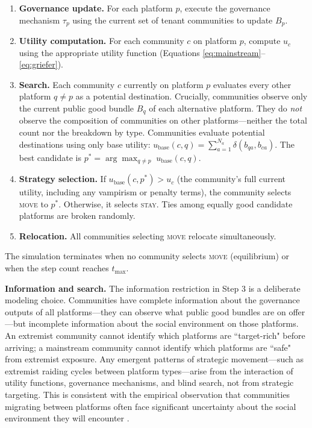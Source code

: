 \documentclass[12pt]{article}
\begin{document}
\begin{enumerate}
    \item \textbf{Governance update.} For each platform $p$, execute the governance mechanism $\tau_p$ using the current set of tenant communities to update $B_p$.
    
    \item \textbf{Utility computation.} For each community $c$ on platform $p$, compute $u_c$ using the appropriate utility function (Equations \ref{eq:mainstream}--\ref{eq:griefer}).
    
    \item \textbf{Search.} Each community $c$ currently on platform $p$ evaluates every other platform $q \neq p$ as a potential destination. Crucially, communities observe only the current public good bundle $B_q$ of each alternative platform. They do \textit{not} observe the composition of communities on other platforms---neither the total count nor the breakdown by type. Communities evaluate potential destinations using only base utility: $u_{\text{base}}(c, q) = \sum_{a=1}^{N_a} \delta(b_{qa}, b_{ca})$. The best candidate is $p^* = \arg\max_{q \neq p} \; u_{\text{base}}(c, q)$.
    
    \item \textbf{Strategy selection.} If $u_{\text{base}}(c, p^*) > u_c$ (the community's full current utility, including any vampirism or penalty terms), the community selects \textsc{move} to $p^*$. Otherwise, it selects \textsc{stay}. Ties among equally good candidate platforms are broken randomly.
    
    \item \textbf{Relocation.} All communities selecting \textsc{move} relocate simultaneously.
\end{enumerate}

\noindent The simulation terminates when no community selects \textsc{move} (equilibrium) or when the step count reaches $t_{\max}$.

\textbf{Information and search.} The information restriction in Step 3 is a deliberate modeling choice. Communities have complete information about the governance outputs of all platforms---they can observe what public good bundles are on offer---but incomplete information about the social environment on those platforms. An extremist community cannot identify which platforms are ``target-rich" before arriving; a mainstream community cannot identify which platforms are ``safe" from extremist exposure. Any emergent patterns of strategic movement---such as extremist raiding cycles between platform types---arise from the interaction of utility functions, governance mechanisms, and blind search, not from strategic targeting. This is consistent with the empirical observation that communities migrating between platforms often face significant uncertainty about the social environment they will encounter \citep{fiesler2020moving, chandrasekharan2017you}.
\end{document}
